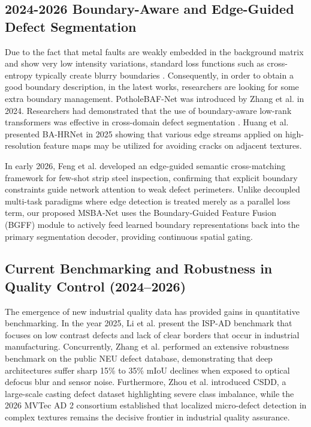 \documentclass{ieeeaccess}
\begin{document}
\subsection{2024-2026 Boundary-Aware and Edge-Guided Defect Segmentation} Due to the fact that metal faults are weakly embedded in the background matrix and show very low intensity variations, standard loss functions such as cross-entropy typically create blurry boundaries \cite{ispad2025, potholebaf2024}. Consequently, in order to obtain a good boundary description, in the latest works, researchers are looking for some extra boundary management. PotholeBAF-Net was introduced by Zhang et al. in 2024. Researchers had demonstrated that the use of boundary-aware low-rank transformers was effective in cross-domain defect segmentation \cite{potholebaf2024}. Huang et al. presented BA-HRNet in 2025 showing that various edge streams applied on high-resolution feature maps may be utilized for avoiding cracks on adjacent textures.

In early 2026, Feng et al. \cite{fewshot_steel2026} developed an edge-guided semantic cross-matching framework for few-shot strip steel inspection, confirming that explicit boundary constraints guide network attention to weak defect perimeters. Unlike decoupled multi-task paradigms where edge detection is treated merely as a parallel loss term, our proposed MSBA-Net uses the Boundary-Guided Feature Fusion (BGFF) module to actively feed learned boundary representations back into the primary segmentation decoder, providing continuous spatial gating.

\subsection{Current Benchmarking and Robustness in Quality Control (2024--2026)}
The emergence of new industrial quality data has provided gains in quantitative benchmarking. In the year 2025, Li et al. \cite{ispad2025} present the ISP-AD benchmark that focuses on low contrast defects and lack of clear borders that occur in industrial manufacturing. Concurrently, Zhang et al. \cite{neu_benchmark2025} performed an extensive robustness benchmark on the public NEU defect database, demonstrating that deep architectures suffer sharp 15\% to 35\% mIoU declines when exposed to optical defocus blur and sensor noise. Furthermore, Zhou et al. \cite{csdd_dataset2025} introduced CSDD, a large-scale casting defect dataset highlighting severe class imbalance, while the 2026 MVTec AD 2 consortium \cite{mvtecad2_2026} established that localized micro-defect detection in complex textures remains the decisive frontier in industrial quality assurance.
\end{document}
